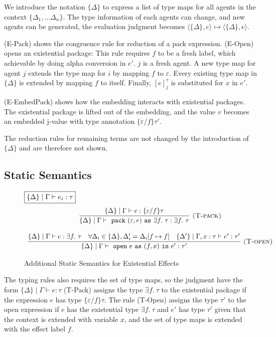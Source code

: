 We introduce the notation $\{\Delta\}$ to express a list of type maps for all agents in the context $\{\Delta_1, \dots \Delta_n\}$. The type information of each agents can change, and new agents can be generated, the evaluation judgment becomes $\langle \{\Delta\}, e \rangle \mapsto \langle \{\Delta\}, e \rangle$. 

(E-Pack) shows the congruence rule for reduction of a pack expression. (E-Open) opens an existential package: This rule requires $f$ to be a fresh label, which achievable by doing alpha conversion in $e'$. $j$ is a fresh agent. A new type map for agent $j$ extends the type map for $i$ by mapping $f$ to $\varepsilon$. Every existing type map in $\{\Delta\}$ is extended by mapping $f$ to itself. Finally, $[e]^\tau_j$ is substituted for $x$ in $e'$.

(E-EmbedPack) shows how the embedding interacts with existential packages. The existential package is lifted out of the embedding, and the value $v$ becomes an embedded j-value with type annotation $\{\varepsilon/f\}\tau'$.

The reduction rules for remaining terms are not changed by the introduction of $\{\Delta\}$ and are therefore not shown. 

\subsection{Static Semantics}
\begin{figure}[t]
\footnotesize{
\noindent$\fbox{$\{\Delta\} \mid \Gamma  \vdash e_i : \tau$}$
\[
\begin{array}{c}

\infer[\textsc{(T-pack)}]
  {\{\Delta\}\mid \Gamma \vdash \m{pack} (\varepsilon, e) \m{as} \exists f.\ \tau : \exists f.\ \tau}
  {\{\Delta\}\mid \Gamma \vdash e : \{\varepsilon / f\} \tau} \\[3ex]
  
\infer[\textsc{(T-open)}]
  {\{\Delta\}\mid \Gamma \vdash \m{open} e \m{as} (f, x) \m{in} e' : \tau'}
  {\{\Delta\}\mid \Gamma \vdash e : \exists f.\ \tau & \forall \Delta_i \in \{\Delta\}, \Delta'_i = \Delta_i[f\mapsto f] & \{\Delta'\}\mid \Gamma, x:\tau \vdash e' : \tau'}

\end{array}
\]
\label{static-exist}
\caption{Additional Static Semantics for Existential Effects}
}
\end{figure}

The typing rules also requires the set of type maps, so the judgment have the form $\{\Delta\} \mid \Gamma \vdash e : \tau$
(T-Pack) assigns the type $\exists f.\ \tau$ to the existential package if the expression $e$ has type $\{\varepsilon/f\}\tau$. The rule (T-Open) assigns the type $\tau'$ to the open expression if $e$ has the existential type $\exists f.\ \tau$ and $e'$ has type $\tau'$ given that the context is extended with variable $x$, and the set of type maps is extended with the effect label $f$. 






